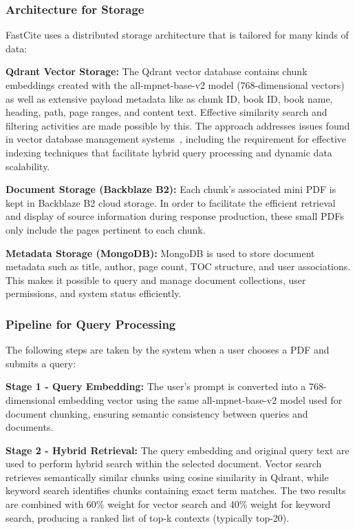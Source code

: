 \documentclass[runningheads]{llncs}
\begin{document}
\subsubsection{Architecture for Storage}

FastCite uses a distributed storage architecture that is tailored for many kinds of data:

\textbf{Qdrant Vector Storage:} The Qdrant vector database contains chunk embeddings created with the all-mpnet-base-v2 model (768-dimensional vectors) as well as extensive payload metadata like as chunk ID, book ID, book name, heading, path, page ranges, and content text. Effective similarity search and filtering activities are made possible by this. The approach addresses issues found in vector database management systems~\cite{wang2025vectordb}, including the requirement for effective indexing techniques that facilitate hybrid query processing and dynamic data scalability.

\textbf{Document Storage (Backblaze B2):} Each chunk's associated mini PDF is kept in Backblaze B2 cloud storage. In order to facilitate the efficient retrieval and display of source information during response production, these small PDFs only include the pages pertinent to each chunk.

\textbf{Metadata Storage (MongoDB):} MongoDB is used to store document metadata such as title, author, page count, TOC structure, and user associations.
This makes it possible to query and manage document collections, user permissions, and system status efficiently.

\subsubsection{Pipeline for Query Processing}

The following steps are taken by the system when a user chooses a PDF and submits a query:

\textbf{Stage 1 - Query Embedding:} The user's prompt is converted into a 768-dimensional embedding vector using the same all-mpnet-base-v2 model used for document chunking, ensuring semantic consistency between queries and documents.

\textbf{Stage 2 - Hybrid Retrieval:} The query embedding and original query text are used to perform hybrid search within the selected document. Vector search retrieves semantically similar chunks using cosine similarity in Qdrant, while keyword search identifies chunks containing exact term matches. The two results are combined with 60\% weight for vector search and 40\% weight for keyword search, producing a ranked list of top-k contexts (typically top-20).
\end{document}
